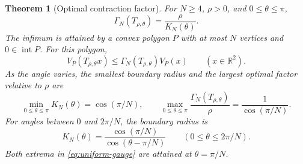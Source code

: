 \documentclass[11pt,a4paper]{article}
\newcommand{\R}{\mathbb R}
\newtheorem{theorem}{Theorem}[section]
\theoremstyle{definition}
\theoremstyle{remark}
\numberwithin{equation}{section}
\begin{document}
\begin{theorem}[Optimal contraction factor]\label{thm:gauges}
For $N\ge4$, $\rho>0$, and $0\le\theta\le\pi$,
\begin{equation}\label{eq:gauge-optimum}
 \Gamma_N(T_{\rho,\theta})=\frac{\rho}{K_N(\theta)}.
\end{equation}
The infimum is attained by a convex polygon $P$ with at most $N$ vertices and $0\in\operatorname{int}P$. For this polygon,
\[
 V_P(T_{\rho,\theta}x)\le
 \Gamma_N(T_{\rho,\theta})V_P(x)\qquad(x\in\R^2).
\]
As the angle varies, the smallest boundary radius and the largest optimal factor relative to $\rho$ are
\begin{equation}\label{eq:uniform-gauge}
 \min_{0\le\theta\le\pi}K_N(\theta)=\cos(\pi/N),\qquad
 \max_{0\le\theta\le\pi}
       \frac{\Gamma_N(T_{\rho,\theta})}{\rho}=\frac{1}{\cos(\pi/N)}.
\end{equation}
For angles between $0$ and $2\pi/N$, the boundary radius is
\begin{equation}\label{eq:first-arc}
 K_N(\theta)=\frac{\cos(\pi/N)}{\cos(\theta-\pi/N)}
 \qquad(0\le\theta\le2\pi/N).
\end{equation}
Both extrema in \eqref{eq:uniform-gauge} are attained at $\theta=\pi/N$.
\end{theorem}
\end{document}
